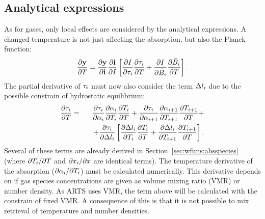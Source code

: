 \subsection{Analytical expressions}
%
As for gases, only local effects are considered by the analytical expressions.
A changed temperature is not just affecting the absorption, but also the Planck
function:
\begin{equation}
  \frac{\partial \mathbf{y}}{\partial T} =  
  \frac{\partial \mathbf{y}}{\partial \mathbf{i}} \frac{\partial \mathbf{i}}{\partial I} 
  \left[
  \frac{\partial I}{\partial \tau_{i}}\frac{\partial \tau_{i}}{\partial T} + 
  \frac{\partial I}{\partial \bar{B}_i}
  \frac{\partial \bar{B}_i}{\partial T} \right].
 \label{eq:wfuns:t1}
\end{equation}
The partial derivative of $\tau_{i}$ must now also consider the term $\Delta
l_{i}$ due to the possible constrain of hydrostatic equilibrium:
\begin{eqnarray}
  \frac{\partial \tau_{i}}{\partial T} &=&
  \frac{\partial \tau_{i}}{\partial {\alpha}_{i}}
  \frac{\partial {\alpha}_{i}}{\partial T_{i}} 
  \frac{\partial T_{i}}{\partial T} +
  \frac{\partial \tau_{i}}{\partial {\alpha}_{i+1}}
  \frac{\partial {\alpha}_{i+1}}{\partial T_{i+1}}
  \frac{\partial T_{i+1}}{\partial T} + \nonumber \\ &&
  \quad + \frac{\partial \tau_{i}}{\partial \Delta l_{i}}
  \left[
    \frac{\partial \Delta l_{i}}{\partial T_{i}} \frac{\partial T_i}{\partial T} +
    \frac{\partial \Delta l_{i}}{\partial T_{i+1}} \frac{\partial T_{i+1}}{\partial T}
  \right].
\end{eqnarray}
Several of these terms are already derived in
Section~\ref{sec:wfuns:absspecies} (where $\partial T_{i}/\partial T$ and
$\partial x_{i}/\partial x$ are identical terms). The temperature
derivative of the absorption ($\partial{\alpha}_{i}/\partial T_{i}$) must be
calculated numerically. This derivative depends on if gas species
concentrations are given as volume mixing ratio (VMR) or number density. As
ARTS uses VMR, the term above will be calculated with the constrain of fixed
VMR. A consequence of this is that it is not possible to mix retrieval of
temperature and number densities.

